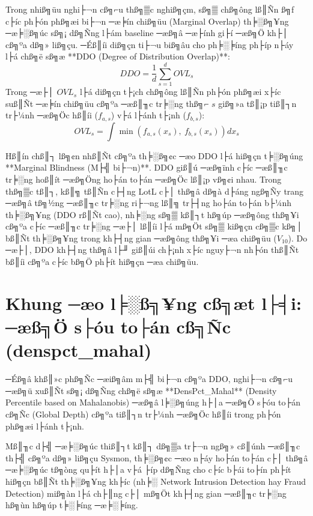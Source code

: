 ﻿\documentclass[../main.tex]{subfiles}
\begin{document}
Trong nhiß╗üu nghi├¬n cß╗⌐u thß╗▒c nghiß╗çm, sß╗▒ chß╗ông lß║Ñn ß╗ƒ c├íc ph├ón phß╗æi bi├¬n ─æ╞ín chiß╗üu (Marginal Overlap) th╞░ß╗¥ng ─æ╞░ß╗úc sß╗¡ dß╗Ñng l├ám baseline ─æß╗â ─æ├ính gi├í ─æß╗Ö kh├│ cß╗ºa dß╗» liß╗çu. ─Éß║íi diß╗çn ti├¬u biß╗âu cho ph╞░╞íng ph├íp n├áy l├á chß╗ë sß╗æ **DDO (Degree of Distribution Overlap)**:
\begin{equation}
    DDO = \frac{1}{d} \sum_{s=1}^{d} OVL_s
\end{equation}
Trong ─æ├│ $OVL_s$ l├á diß╗çn t├¡ch chß╗ông lß║Ñn ph├ón phß╗æi x├íc suß║Ñt ─æ╞ín chiß╗üu cß╗ºa ─æß║╖c tr╞░ng thß╗⌐ $s$ giß╗»a tß║¡p tiß║┐n tr├¼nh ─æß╗Öc hß║íi ($f_{a,s}$) v├á l├ánh t├¡nh ($f_{b,s}$):
\begin{equation}
    OVL_s = \int \min\left( f_{a,s}(x_s),\ f_{b,s}(x_s) \right) dx_s
\end{equation}

Hß║ín chß║┐ lß╗¢n nhß║Ñt cß╗ºa th╞░ß╗¢c ─æo DDO l├á hiß╗çn t╞░ß╗úng **Marginal Blindness (M├╣ bi├¬n)**. DDO giß║ú ─æß╗ïnh c├íc ─æß║╖c tr╞░ng hoß║ít ─æß╗Öng ho├án to├án ─æß╗Öc lß║¡p vß╗¢i nhau. Trong thß╗▒c tß║┐, kß║╗ tß║Ñn c├┤ng LotL c├│ thß╗â dß╗à d├áng ngß╗Ñy trang ─æß╗â tß╗½ng ─æß║╖c tr╞░ng ri├¬ng lß║╗ tr├┤ng ho├án to├án b├¼nh th╞░ß╗¥ng (DDO rß║Ñt cao), nh╞░ng sß╗▒ kß║┐t hß╗úp ─æß╗ông thß╗¥i cß╗ºa c├íc ─æß║╖c tr╞░ng ─æ├│ lß║íi l├á mß╗Öt sß╗▒ kiß╗çn cß╗▒c kß╗│ bß║Ñt th╞░ß╗¥ng trong kh├┤ng gian ─æß╗ông thß╗¥i ─æa chiß╗üu ($V_{10}$). Do ─æ├│, DDO kh├┤ng thß╗â l├╜ giß║úi ch├¡nh x├íc nguy├¬n nh├ón thß║Ñt bß║íi cß╗ºa c├íc bß╗Ö ph├ít hiß╗çn ─æa chiß╗üu.

\section{Khung ─æo l╞░ß╗¥ng cß╗æt l├╡i: ─æß╗Ö s├óu to├án cß╗Ñc (denspct\_mahal)}
\label{section:2.5}

─Éß╗â khß║»c phß╗Ñc ─æiß╗âm m├╣ bi├¬n cß╗ºa DDO, nghi├¬n cß╗⌐u ─æß╗ü xuß║Ñt sß╗¡ dß╗Ñng chß╗ë sß╗æ **DensPct\_Mahal** (Density Percentile based on Mahalanobis) ─æß╗â l╞░ß╗úng h├│a ─æß╗Ö s├óu to├án cß╗Ñc (Global Depth) cß╗ºa tiß║┐n tr├¼nh ─æß╗Öc hß║íi trong ph├ón phß╗æi l├ánh t├¡nh.

Mß║╖c d├╣ ─æ╞░ß╗úc thiß║┐t kß║┐ dß╗▒a tr├¬n ngß╗» cß║únh ─æß║╖c th├╣ cß╗ºa dß╗» liß╗çu Sysmon, th╞░ß╗¢c ─æo n├áy ho├án to├án c├│ thß╗â ─æ╞░ß╗úc tß╗òng qu├ít h├│a v├á ├íp dß╗Ñng cho c├íc b├ái to├ín ph├ít hiß╗çn bß║Ñt th╞░ß╗¥ng kh├íc (nh╞░ Network Intrusion Detection hay Fraud Detection) miß╗àn l├á ch├║ng c├│ mß╗Öt kh├┤ng gian ─æß║╖c tr╞░ng hß╗ùn hß╗úp t╞░╞íng ─æ╞░╞íng.
\end{document}
